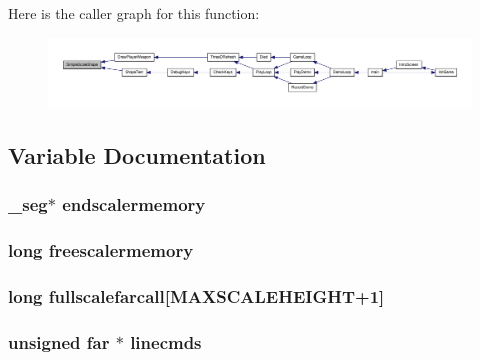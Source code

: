 Here is the caller graph for this function:
\nopagebreak
\begin{figure}[H]
\begin{center}
\leavevmode
\includegraphics[width=400pt]{CONTIGSC_8C_a11d04052928f61aec9102f6cce71fadb_icgraph}
\end{center}
\end{figure}




\subsection{Variable Documentation}
\hypertarget{CONTIGSC_8C_acc8981c41b0a6cb0db5f2703f83ab50e}{
\subsubsection[{endscalermemory}]{ \_\-seg$\ast$ {\bf endscalermemory}}}
\label{CONTIGSC_8C_acc8981c41b0a6cb0db5f2703f83ab50e}
\hypertarget{CONTIGSC_8C_a5ae0a742f3010ac7cec93d2a7046ad7c}{
\subsubsection[{freescalermemory}]{\setlength{\rightskip}{0pt plus 5cm}long {\bf freescalermemory}}}
\label{CONTIGSC_8C_a5ae0a742f3010ac7cec93d2a7046ad7c}
\hypertarget{CONTIGSC_8C_a4b3db832e1c51c7a13e5e973de3115b3}{
\subsubsection[{fullscalefarcall}]{\setlength{\rightskip}{0pt plus 5cm}long {\bf fullscalefarcall}\mbox{[}MAXSCALEHEIGHT+1\mbox{]}}}
\label{CONTIGSC_8C_a4b3db832e1c51c7a13e5e973de3115b3}
\hypertarget{CONTIGSC_8C_a1f5a9f548c7a29c13b62f5fdc2a24ea8}{
\subsubsection[{linecmds}]{\setlength{\rightskip}{0pt plus 5cm}unsigned far $\ast$ {\bf linecmds}}}
